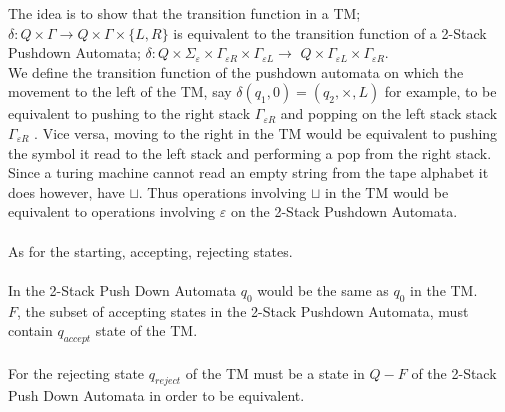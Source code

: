 \documentclass{report}
\newcommand{\me}[1]{
\begin{math}
#1
\end{math}
}
\begin{document}
The idea is to show that the transition function in a TM; \me{\delta: Q \times \Gamma \to Q \times \Gamma \times  \{L,R\}} is equivalent to the transition function of a 2-Stack Pushdown Automata; \me{\delta: Q \times \Sigma_{\varepsilon} \times \Gamma_{\varepsilon R} \times \Gamma_{\varepsilon L}  \to } $Q \times \Gamma_{\varepsilon L}\times \Gamma_{\varepsilon R}$. \\

We define the transition function of the pushdown automata on which the movement to the left of the TM, say \me{\delta(q_1,0) = (q_2,\times,L)} for example, to be equivalent to pushing to the right stack \me{\Gamma_{\varepsilon R} } and popping on the left stack stack \me{\Gamma_{\varepsilon R} }. Vice versa, moving to the right in the TM would be equivalent to pushing the symbol it read to the left stack and performing a pop from the right stack.  Since a turing machine cannot read an empty string from the tape alphabet it does however, have $\sqcup$. Thus operations involving $\sqcup$ in the TM would be equivalent to operations involving $\varepsilon$ on the 2-Stack Pushdown Automata. \\ \\
As for the starting, accepting, rejecting states. \\ \\
In the 2-Stack Push Down Automata $q_0$ would be the same as $q_0 $ in the TM. \\
$F$, the subset of accepting states in the 2-Stack Pushdown Automata, must contain $q_{accept}$ state of the TM.\\ \\
For the rejecting state $q_{reject}$ of the TM must be a state in $Q - F$ of the 2-Stack Push Down Automata in order to be equivalent.
 
 
 
 \newpage
\end{document}
